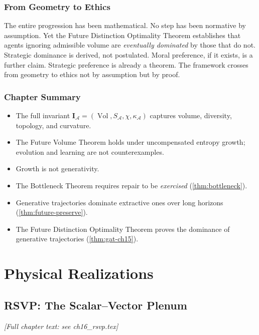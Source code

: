 \documentclass[12pt,twoside,openright]{book}
\newcommand{\adm}{\mathcal{A}}
\newcommand{\Vol}{\operatorname{Vol}}
\newenvironment{chapsummary}{%
  \begin{tcolorbox}[colback=DistBlue!5,colframe=DistBlue,
    title={\faBookOpen\enspace Summary},
    fonttitle=\sffamily\bfseries\color{white},
    attach boxed title to top left={yshift=-2mm,xshift=4mm},
    boxed title style={colback=DistBlue,rounded corners}]
  \begin{itemize}[nosep,leftmargin=*]}{%
  \end{itemize}\end{tcolorbox}}
\newcounter{exercise}[chapter]
\begin{document}
\section{From Geometry to Ethics}

The entire progression has been mathematical. No step has
been normative by assumption. Yet the Future Distinction
Optimality Theorem establishes that agents ignoring
admissible volume are \emph{eventually dominated} by those
that do not. Strategic dominance is derived, not postulated.
Moral preference, if it exists, is a further claim.
Strategic preference is already a theorem. The framework
crosses from geometry to ethics not by assumption but
by proof.

\section*{Chapter Summary}
\begin{chapsummary}
  \item The full invariant
        $\mathbf{I}_\adm=(\Vol,S_\adm,\chi,\kappa_\adm)$
        captures volume, diversity, topology, and curvature.
  \item The Future Volume Theorem holds under uncompensated
        entropy growth; evolution and learning are not
        counterexamples.
  \item Growth is not generativity.
  \item The Bottleneck Theorem requires repair to be
        \emph{exercised} (\cref{thm:bottleneck}).
  \item Generative trajectories dominate extractive ones
        over long horizons (\cref{thm:future-preserve}).
  \item The Future Distinction Optimality Theorem proves
        the dominance of generative trajectories
        (\cref{thm:gat-ch15}).
\end{chapsummary}


\part{Physical Realizations}

\chapter{RSVP: The Scalar--Vector Plenum}
\label{ch:rsvp}
\emph{[Full chapter text: see ch16\_rsvp.tex]}
\end{document}

